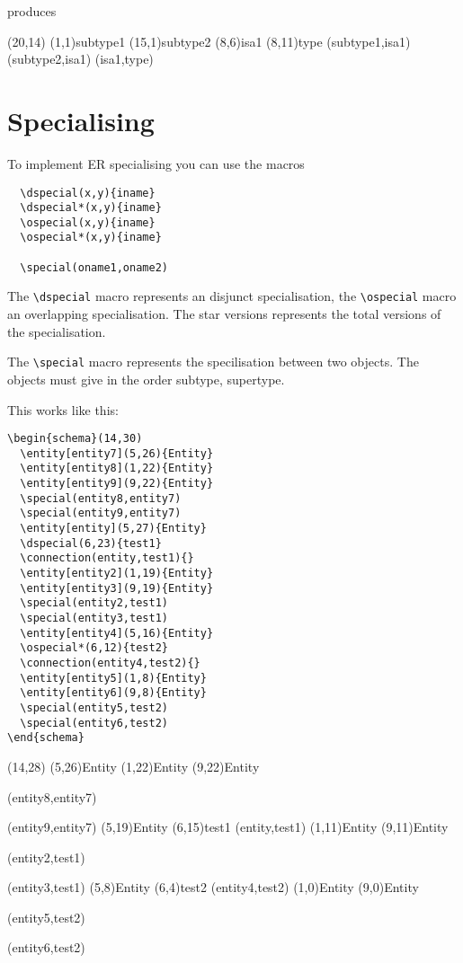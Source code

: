 \documentclass[a4paper,11pt]{article}
\begin{document}
produces

\begin{schema}(20,14)
  \entity(1,1){subtype1}
  \entity(15,1){subtype2}
  \isa(8,6){isa1}
  \entity(8,11){type}
  \conn(subtype1,isa1){}
  \conn(subtype2,isa1){}
  \conn(isa1,type){}
\end{schema}

\section{Specialising}

To implement ER specialising you can use the macros

\begin{verbatim}
  \dspecial(x,y){iname}
  \dspecial*(x,y){iname}
  \ospecial(x,y){iname}
  \ospecial*(x,y){iname}
 
  \special(oname1,oname2)
\end{verbatim}

The \verb|\dspecial| macro represents an disjunct specialisation, the \verb|\ospecial| macro 
an overlapping specialisation. The star versions represents the total versions of the 
specialisation.

The \verb|\special| macro represents the specilisation between two objects. The objects must give in the 
order subtype, supertype.

This works like this:

\begin{verbatim}
\begin{schema}(14,30)
  \entity[entity7](5,26){Entity}
  \entity[entity8](1,22){Entity}
  \entity[entity9](9,22){Entity}
  \special(entity8,entity7)
  \special(entity9,entity7)
  \entity[entity](5,27){Entity}
  \dspecial(6,23){test1}
  \connection(entity,test1){}
  \entity[entity2](1,19){Entity}
  \entity[entity3](9,19){Entity}
  \special(entity2,test1)
  \special(entity3,test1)
  \entity[entity4](5,16){Entity}
  \ospecial*(6,12){test2}
  \connection(entity4,test2){}
  \entity[entity5](1,8){Entity}
  \entity[entity6](9,8){Entity}
  \special(entity5,test2)
  \special(entity6,test2)
\end{schema}
\end{verbatim}

\begin{schema}(14,28)
  \entity[entity7](5,26){Entity}
  \entity[entity8](1,22){Entity}
  \entity[entity9](9,22){Entity}
  \special(entity8,entity7)
  \special(entity9,entity7)
  \entity[entity](5,19){Entity}
  \dspecial(6,15){test1}
  \connection(entity,test1){}
  \entity[entity2](1,11){Entity}
  \entity[entity3](9,11){Entity}
  \special(entity2,test1)
  \special(entity3,test1)
  \entity[entity4](5,8){Entity}
  \ospecial*(6,4){test2}
  \connection(entity4,test2){}
  \entity[entity5](1,0){Entity}
  \entity[entity6](9,0){Entity}
  \special(entity5,test2)
  \special(entity6,test2)
\end{schema}
\end{document}
